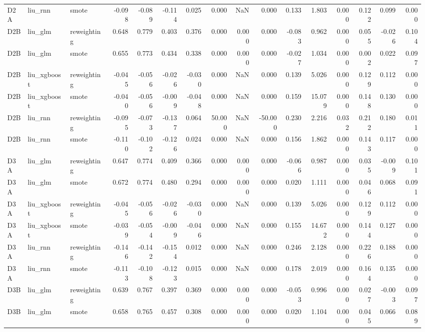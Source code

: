 \begin{tabular}{lllrrrrrrrrrrrrr}
D2A & liu_rnn & smote & -0.098 & -0.089 & -0.114 & 0.025 & 0.000 & NaN & 0.000 & 0.133 & 1.803 & 0.000 & 0.122 & 0.099 & 0.000 \\
D2B & liu_glm & reweighting & 0.648 & 0.779 & 0.403 & 0.376 & 0.000 & 0.000 & 0.000 & -0.083 & 0.962 & 0.000 & 0.055 & -0.026 & 0.104 \\
D2B & liu_glm & smote & 0.655 & 0.773 & 0.434 & 0.338 & 0.000 & 0.000 & 0.000 & -0.027 & 1.034 & 0.000 & 0.002 & 0.022 & 0.097 \\
D2B & liu_xgboost & reweighting & -0.045 & -0.056 & -0.026 & -0.030 & 0.000 & NaN & 0.000 & 0.139 & 5.026 & 0.000 & 0.129 & 0.112 & 0.000 \\
D2B & liu_xgboost & smote & -0.040 & -0.056 & -0.009 & -0.048 & 0.000 & NaN & 0.000 & 0.159 & 15.079 & 0.000 & 0.148 & 0.130 & 0.000 \\
D2B & liu_rnn & reweighting & -0.095 & -0.073 & -0.137 & 0.064 & 50.000 & NaN & -50.000 & 0.230 & 2.216 & 0.032 & 0.212 & 0.180 & 0.011 \\
D2B & liu_rnn & smote & -0.110 & -0.102 & -0.126 & 0.024 & 0.000 & NaN & 0.000 & 0.156 & 1.862 & 0.000 & 0.143 & 0.117 & 0.000 \\
D3A & liu_glm & reweighting & 0.647 & 0.774 & 0.409 & 0.366 & 0.000 & 0.000 & 0.000 & -0.066 & 0.987 & 0.000 & 0.035 & -0.009 & 0.101 \\
D3A & liu_glm & smote & 0.672 & 0.774 & 0.480 & 0.294 & 0.000 & 0.000 & 0.000 & 0.020 & 1.111 & 0.000 & 0.046 & 0.068 & 0.091 \\
D3A & liu_xgboost & reweighting & -0.045 & -0.056 & -0.026 & -0.030 & 0.000 & NaN & 0.000 & 0.139 & 5.026 & 0.000 & 0.129 & 0.112 & 0.000 \\
D3A & liu_xgboost & smote & -0.039 & -0.054 & -0.009 & -0.046 & 0.000 & NaN & 0.000 & 0.155 & 14.672 & 0.000 & 0.144 & 0.127 & 0.000 \\
D3A & liu_rnn & reweighting & -0.146 & -0.142 & -0.154 & 0.012 & 0.000 & NaN & 0.000 & 0.246 & 2.128 & 0.000 & 0.226 & 0.188 & 0.000 \\
D3A & liu_rnn & smote & -0.113 & -0.108 & -0.123 & 0.015 & 0.000 & NaN & 0.000 & 0.178 & 2.019 & 0.000 & 0.164 & 0.135 & 0.000 \\
D3B & liu_glm & reweighting & 0.639 & 0.767 & 0.397 & 0.369 & 0.000 & 0.000 & 0.000 & -0.053 & 0.996 & 0.000 & 0.027 & -0.003 & 0.097 \\
D3B & liu_glm & smote & 0.658 & 0.765 & 0.457 & 0.308 & 0.000 & 0.000 & 0.000 & 0.020 & 1.104 & 0.000 & 0.045 & 0.066 & 0.089 \\

\end{tabular}
